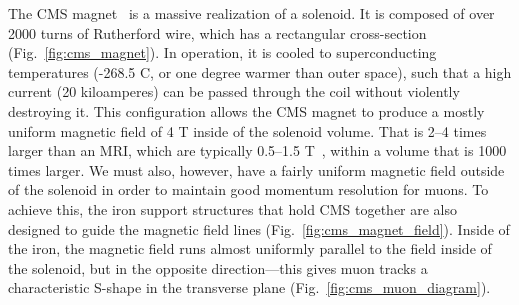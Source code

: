 The CMS magnet~\cite{CERN-LHCC-97-010} is a massive\footnotemark{} realization of a solenoid. 
It is composed of over 2000 turns of Rutherford wire, which has a rectangular cross-section (Fig.~\ref{fig:cms_magnet}). 
In operation, it is cooled to superconducting temperatures (-268.5 \de{}C, or one degree warmer than outer space), such that a high current (20 kiloamperes\footnotemark{}) can be passed through the coil without violently destroying it. 
This configuration allows the CMS magnet to produce a mostly uniform magnetic field of 4 T inside of the solenoid volume. 
That is 2--4 times larger than an MRI, which are typically 0.5--1.5 T~\cite{Berger2002-gs}, within a volume that is 1000 times larger. %
We must also, however, have a fairly uniform magnetic field outside of the solenoid in order to maintain good momentum resolution for muons. 
To achieve this, the iron support structures that hold CMS together are also designed to guide the magnetic field lines (Fig.~\ref{fig:cms_magnet_field}). 
Inside of the iron, the magnetic field runs almost uniformly parallel to the field inside of the solenoid, but in the opposite direction---this gives muon tracks a characteristic S-shape in the transverse plane (Fig.~\ref{fig:cms_muon_diagram}). 

